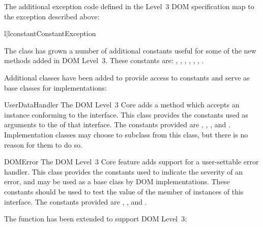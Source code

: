 \documentclass{howto}
\begin{document}
The additional exception code defined in the Level~3 DOM specification
map to the exception described above:

\begin{tableii}{l|l}{constant}{Constant}{Exception}
\end{tableii}

The  class has grown a number of additional constants
useful for some of the new methods added in DOM Level~3.  These
constants are:  ,
, ,
,
,
,
.

Additional classes have been added to provide access to constants and
serve as base classes for implementations:

\begin{classdesc*}{UserDataHandler}
  The DOM Level~3 Core adds a method
   which accepts an instance conforming to the
   interface.  This class provides the
  constants used as arguments to the  of that
  interface.  The constants provided are ,
  , , and
  .  Implementation classes may choose to
  subclass from this class, but there is no reason for them to do so.
\end{classdesc*}

\begin{classdesc*}{DOMError}
  The DOM Level~3 Core feature adds support for a user-settable
  error handler.  This class provides the constants used to indicate
  the severity of an error, and may be used as a base class by DOM
  implementations.  These constants should be used to test the value
  of the  member of instances of this interface.  The
  constants provided are ,
  , and .
\end{classdesc*}

The  function has been extended to
support DOM Level~3:
\end{document}
